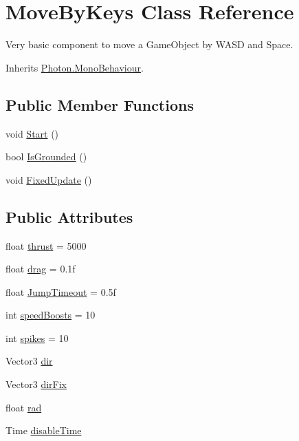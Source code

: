 \hypertarget{class_move_by_keys}{}\section{Move\+By\+Keys Class Reference}
\label{class_move_by_keys}


Very basic component to move a Game\+Object by W\+A\+SD and Space.  




Inherits \hyperlink{class_photon_1_1_mono_behaviour}{Photon.\+Mono\+Behaviour}.

\subsection*{Public Member Functions}
\begin{DoxyCompactItemize}
\item 
void \hyperlink{class_move_by_keys_a12c386cc63b886a811e2801c6631f7c6}{Start} ()
\item 
bool \hyperlink{class_move_by_keys_a12f570fff90c264f8ff855d82886d732}{Is\+Grounded} ()
\item 
void \hyperlink{class_move_by_keys_aeeea5b489d6daab0aa8e9fc1672f5310}{Fixed\+Update} ()
\end{DoxyCompactItemize}
\subsection*{Public Attributes}
\begin{DoxyCompactItemize}
\item 
float \hyperlink{class_move_by_keys_a5702f7b18a522ed877f1c1683e3acd6e}{thrust} = 5000
\item 
float \hyperlink{class_move_by_keys_a5edbdd945711dcfbe8bb4f167ba58792}{drag} = 0.\+1f
\item 
float \hyperlink{class_move_by_keys_a78f351dfc4cfdf17213df54dee9ba73f}{Jump\+Timeout} = 0.\+5f
\item 
int \hyperlink{class_move_by_keys_abe7c462b0359cd7923ee81166dcbce50}{speed\+Boosts} = 10
\item 
int \hyperlink{class_move_by_keys_a69b4ceaaa671fa3a62ee1281b7c755b7}{spikes} = 10
\item 
Vector3 \hyperlink{class_move_by_keys_a06a0f4cd939aba5cf42ad4aa1626ec55}{dir}
\item 
Vector3 \hyperlink{class_move_by_keys_abf85f85c6014dd249ceb5d5d6bd54353}{dir\+Fix}
\item 
float \hyperlink{class_move_by_keys_ab257d4fc7ebb9aa457bb19c85dc7874d}{rad}
\item 
Time \hyperlink{class_move_by_keys_abc8e3273ebda7bbcfb644708d97d00af}{disable\+Time}
\end{DoxyCompactItemize}
